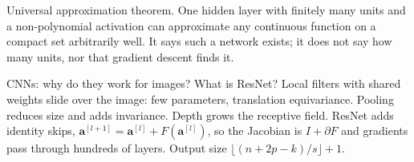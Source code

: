 \begin{qabox}[Lehner]{\asked Universal approximation theorem.}
\ans One hidden layer with finitely many units and a non-polynomial activation can approximate
any continuous function on a compact set arbitrarily well. It says such a network exists; it does
not say how many units, nor that gradient descent finds it.
\end{qabox}

\begin{qabox}[Klambauer]{\pred CNNs: why do they work for images? What is ResNet?}
\ans Local filters with shared weights slide over the image: few parameters, translation
equivariance. Pooling reduces size and adds invariance. Depth grows the receptive field. ResNet
adds identity skips, $\mathbf{a}^{[l+1]}=\mathbf{a}^{[l]}+F(\mathbf{a}^{[l]})$, so the Jacobian is
$I+\partial F$ and gradients pass through hundreds of layers.
\formula Output size $\lfloor(n+2p-k)/s\rfloor+1$.
\end{qabox}
